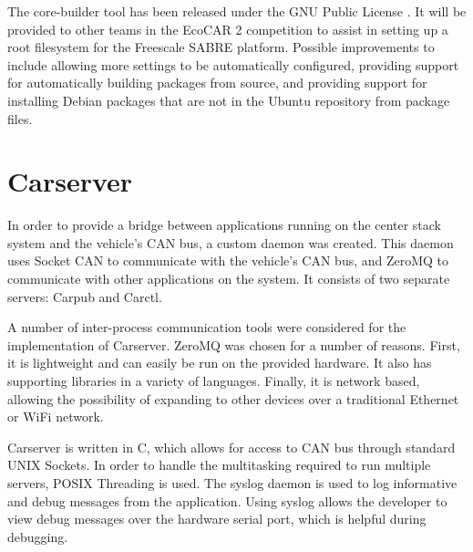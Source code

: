 \documentclass[ece]{uw-wkrpt}
\begin{document}
The core-builder tool has been released under the GNU Public License
\cite{ref:gpl}.
It will be provided to other teams in the EcoCAR 2 competition to assist in
setting up a root filesystem for the Freescale SABRE platform. Possible
improvements to include allowing more settings to be automatically configured,
providing support for automatically building packages from source, and providing
support for installing Debian packages that are not in the Ubuntu repository
from package files.

\section{Carserver}

In order to provide a bridge between applications running on the center stack
system and the vehicle's CAN bus, a custom daemon was created. This daemon uses
Socket CAN to communicate with the vehicle's CAN bus, and ZeroMQ to
communicate with other applications on the system. It consists of two separate
servers: Carpub and Carctl.

A number of inter-process communication tools were considered for the
implementation of Carserver. ZeroMQ was chosen for a number of reasons. First,
it is lightweight and can easily be run on the provided hardware. It also has
supporting libraries in a variety of languages. Finally, it is network based,
allowing the possibility of expanding to other devices over a traditional
Ethernet or WiFi network.

Carserver is written in C, which allows for access to CAN bus through standard
UNIX Sockets. In order to handle the multitasking required to run multiple
servers, POSIX Threading is used. The syslog daemon is used to log informative
and debug messages from the application. Using syslog allows the developer to
view debug messages over the hardware serial port, which is helpful during
debugging.
\end{document}
